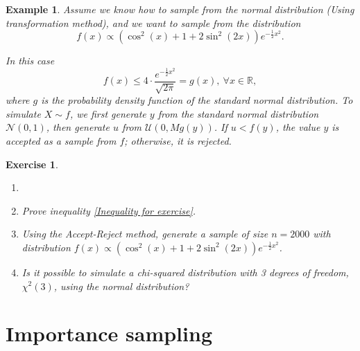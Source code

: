 \documentclass{article}\usepackage[]{graphicx}\usepackage[]{xcolor}
\newtheorem{exercise}{Exercise}
\newtheorem{example}{Example}
\begin{document}
\begin{example}\label{Generating a distr bounded by the normal distribution}
Assume we know how to sample from the normal distribution (Using transformation method), and we want to sample from the distribution 
\begin{equation*}
f(x) \propto \left( \cos^2(x) + 1 + 2\sin^2(2x)\right) e^{-\frac{1}{2} x^2}.
\end{equation*}

In this case 
\begin{equation}\label{Inequality for exercise}
f(x) \leq 4 \cdot \frac{e^{-\frac{1}{2}x^2}}{\sqrt{2\pi}} = g(x), ~\forall x \in \mathbb{R},
\end{equation}
where $g$ is the probability density function of the standard normal distribution. To simulate $X \sim f$, we first generate $y$ from the standard normal distribution $\mathcal{N}(0,1)$, then generate $u$ from $\mathcal{U}(0, M g(y))$. If $u < f(y)$, the value $y$ is accepted as a sample from $f$; otherwise, it is rejected.

\end{example}

\begin{exercise}
\begin{enumerate}
\item[]
\item Prove inequality \eqref{Inequality for exercise}.
\item Using the Accept-Reject method, generate a sample of size $n=2000$ with distribution $f(x) \propto \left( \cos^2(x) + 1 + 2\sin^2(2x)\right) e^{-\frac{1}{2} x^2}$.
\item Is it possible to simulate a chi-squared distribution with 3 degrees of freedom, $\chi^2(3)$, using the normal distribution?
\end{enumerate}

\end{exercise}



\newpage
\section{Importance sampling}
\end{document}

